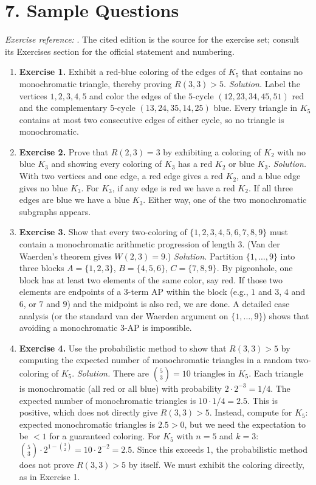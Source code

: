 \section*{7. Sample Questions}
\emph{Exercise reference:} \cite{ramsey_ref1}. The cited edition is the source for the exercise set; consult its Exercises section for the official statement and numbering.
\begin{enumerate}[leftmargin=*,itemsep=0.9em]
\item \textbf{Exercise 1.} Exhibit a red-blue coloring of the edges of $K_5$ that contains no monochromatic triangle, thereby proving $R(3,3)>5$. \emph{Solution.} Label the vertices $1,2,3,4,5$ and color the edges of the $5$-cycle $(12,23,34,45,51)$ red and the complementary $5$-cycle $(13,24,35,14,25)$ blue. Every triangle in $K_5$ contains at most two consecutive edges of either cycle, so no triangle is monochromatic.

\item \textbf{Exercise 2.} Prove that $R(2,3)=3$ by exhibiting a coloring of $K_2$ with no blue $K_3$ and showing every coloring of $K_3$ has a red $K_2$ or blue $K_3$. \emph{Solution.} With two vertices and one edge, a red edge gives a red $K_2$, and a blue edge gives no blue $K_3$. For $K_3$, if any edge is red we have a red $K_2$. If all three edges are blue we have a blue $K_3$. Either way, one of the two monochromatic subgraphs appears.

\item \textbf{Exercise 3.} Show that every two-coloring of $\{1,2,3,4,5,6,7,8,9\}$ must contain a monochromatic arithmetic progression of length $3$. (Van der Waerden's theorem gives $W(2,3)=9$.) \emph{Solution.} Partition $\{1,\ldots,9\}$ into three blocks $A=\{1,2,3\}$, $B=\{4,5,6\}$, $C=\{7,8,9\}$. By pigeonhole, one block has at least two elements of the same color, say red. If those two elements are endpoints of a 3-term AP within the block (e.g., $1$ and $3$, $4$ and $6$, or $7$ and $9$) and the midpoint is also red, we are done. A detailed case analysis (or the standard van der Waerden argument on $\{1,\ldots,9\}$) shows that avoiding a monochromatic 3-AP is impossible.

\item \textbf{Exercise 4.} Use the probabilistic method to show that $R(3,3)>5$ by computing the expected number of monochromatic triangles in a random two-coloring of $K_5$. \emph{Solution.} There are $\binom{5}{3}=10$ triangles in $K_5$. Each triangle is monochromatic (all red or all blue) with probability $2\cdot 2^{-3}=1/4$. The expected number of monochromatic triangles is $10\cdot 1/4=2.5$. This is positive, which does not directly give $R(3,3)>5$. Instead, compute for $K_5$: expected monochromatic triangles is $2.5>0$, but we need the expectation to be $<1$ for a guaranteed coloring. For $K_5$ with $n=5$ and $k=3$: $\binom{5}{3}\cdot 2^{1-\binom{3}{2}}=10\cdot 2^{-2}=2.5$. Since this exceeds $1$, the probabilistic method does not prove $R(3,3)>5$ by itself. We must exhibit the coloring directly, as in Exercise 1.


\end{enumerate}
